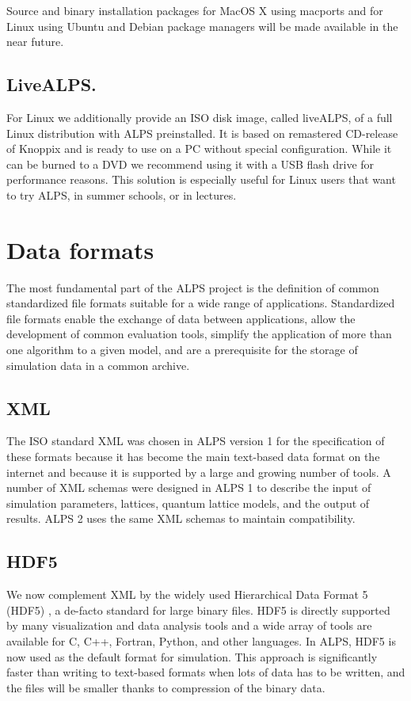 \documentclass[12pt]{iopart}
\begin{document}
Source and binary installation packages for MacOS X using macports \cite{macports} and for Linux using Ubuntu and Debian package managers will be made available in the near future.


\subsection{LiveALPS.}

For Linux we additionally provide an ISO disk image, called liveALPS, of a full Linux distribution with ALPS preinstalled.  It is  
based on remastered CD-release of Knoppix \cite{knoppix} and is ready to use 
on a PC without special configuration. While it can be burned to a DVD we recommend using it with a USB flash drive for performance reasons.
This  solution is especially useful for Linux users that want to try ALPS, in summer schools, or in lectures.

\section{Data formats}

The most fundamental part of the ALPS project is the definition of
common standardized file formats suitable for a wide range of
applications. Standardized file formats enable the exchange of data
between applications, allow the development of common evaluation
tools, simplify the application of more than one algorithm to a given
model, and are a prerequisite for the storage of simulation data in a
common archive.

\subsection{XML}
 The ISO
standard XML \cite{xml} was chosen in ALPS version 1 \cite{ALPS1.2,ALPS1.3} for the specification of these formats
because it has become
the main text-based data format on the internet and because it is
supported by a large and growing number of tools.
A number of XML  schemas \cite{xmlschema} were designed in ALPS 1 to describe the input of simulation parameters, lattices,  quantum lattice models, and the output of results. ALPS 2 uses the same XML schemas to maintain compatibility.

\subsection{HDF5}

We now complement XML by the widely used Hierarchical Data Format 5 (HDF5) \cite{hdf5}, a de-facto standard for large binary files.  HDF5 is directly supported by many visualization and data analysis tools and a wide array of tools are 
available for C, C++, Fortran, Python, and other languages. In ALPS, HDF5 is now used as the default format for simulation.  This approach is significantly faster than writing to text-based formats when lots of data has to be written, and the files will be smaller thanks to compression of the binary data. 
\end{document}
